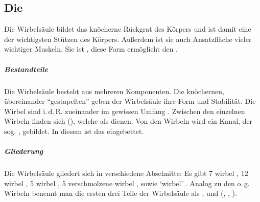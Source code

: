 
\bigskip 

\bigskip

\bigskip

\subsection{Die }
\TextSlide{\TxBeschreibung}
{%
Die Wirbelsäule bildet das knöcherne Rückgrat des Körpers
und ist damit eine der wichtigsten Stützen des Körpers.
%
Außerdem ist sie auch Ansatzfläche vieler wichtiger
Muskeln. 
%
Sie ist ,
diese Form ermöglicht den .

\subparagraph{Bestandteile}

Die Wirbelsäule besteht aus mehreren Komponenten. Die
knöchernen, übereinander \protect\enquote{gestapelten} 
 geben der Wirbelsäule ihre Form und
Stabilität. Die Wirbel sind i.\,d.\,R. zueinander im
gewissen Umfang .
Zwischen den einzelnen Wirbeln finden sich 
(), welche als  dienen. 
%
Von den Wirbeln wird ein Kanal, der sog. ,
gebildet. In diesem ist das  eingebettet.

\subparagraph{Gliederung} Die Wirbelsäule gliedert sich in
verschiedene Abschnitte: 
Es gibt  7 wirbel ,  12 wirbel 
, 5
wirbel , 5
verschmolzene wirbel , sowie 
\protect\enquote*{wirbel} .
%
Analog zu den o.\,g. Wirbeln benennt man die ersten drei Teile der Wirbelsäule 
als 
,
und 
(, , ).






}
